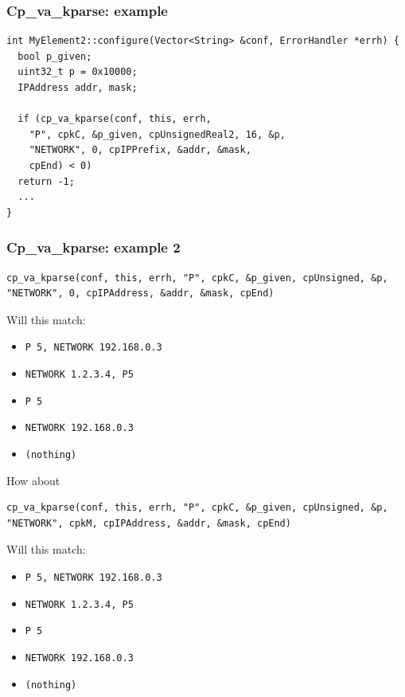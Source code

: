 \documentclass{beamer}
\begin{document}
\begin{frame}[fragile]
\frametitle{Cp\_va\_kparse: example}
\begin{lstlisting}[basicstyle=\footnotesize]
int MyElement2::configure(Vector<String> &conf, ErrorHandler *errh) {
  bool p_given;
  uint32_t p = 0x10000;
  IPAddress addr, mask;
  
  if (cp_va_kparse(conf, this, errh,
    "P", cpkC, &p_given, cpUnsignedReal2, 16, &p,
    "NETWORK", 0, cpIPPrefix, &addr, &mask,
    cpEnd) < 0)
  return -1;
  ...
}
\end{lstlisting}
\end{frame}

\begin{frame}
\frametitle{Cp\_va\_kparse: example 2}
\begin{lstlisting}
cp_va_kparse(conf, this, errh, "P", cpkC, &p_given, cpUnsigned, &p, "NETWORK", 0, cpIPAddress, &addr, &mask, cpEnd)
\end{lstlisting}
Will this match:
\begin{itemize}
	\item \lstinline!P 5, NETWORK 192.168.0.3!
	\item \lstinline!NETWORK 1.2.3.4, P5     !
	\item \lstinline!P 5                     !
	\item \lstinline!NETWORK 192.168.0.3     !
	\item \lstinline!(nothing)               !
\end{itemize}
\framebreak
How about
\begin{lstlisting}
cp_va_kparse(conf, this, errh, "P", cpkC, &p_given, cpUnsigned, &p, "NETWORK", cpkM, cpIPAddress, &addr, &mask, cpEnd)
\end{lstlisting}
Will this match:
\begin{itemize}
	\item \lstinline!P 5, NETWORK 192.168.0.3!
	\item \lstinline!NETWORK 1.2.3.4, P5     !
	\item \lstinline!P 5                     !
	\item \lstinline!NETWORK 192.168.0.3     !
	\item \lstinline!(nothing)               !
\end{itemize}
\end{frame}
\end{document}
